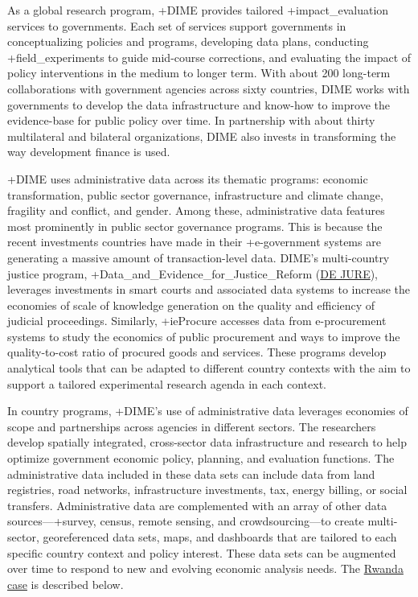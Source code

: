 \documentclass[
]{book}
\begin{document}
As a global research program, +DIME\textbar{} provides tailored +impact\_evaluation\textbar{} services to governments. Each set of services support governments in conceptualizing policies and programs, developing data plans, conducting +field\_experiments\textbar{} to guide mid-course corrections, and evaluating the impact of policy interventions in the medium to longer term. With about 200 long-term collaborations with government agencies across sixty countries, DIME works with governments to develop the data infrastructure and know-how to improve the evidence-base for public policy over time. In partnership with about thirty multilateral and bilateral organizations, DIME also invests in transforming the way development finance is used.

+DIME\textbar{} uses administrative data across its thematic programs: economic transformation, public sector governance, infrastructure and climate change, fragility and conflict, and gender. Among these, administrative data features most prominently in public sector governance programs. This is because the recent investments countries have made in their +e-government\textbar{} systems are generating a massive amount of transaction-level data. DIME's multi-country justice program, +Data\_and\_Evidence\_for\_Justice\_Reform\textbar{} (\href{http://pubdocs.worldbank.org/en/923891592406548876/DE-JURE-Brief.pdf}{DE JURE}), leverages investments in smart courts and associated data systems to increase the economies of scale of knowledge generation on the quality and efficiency of judicial proceedings. Similarly, +ieProcure\textbar{} accesses data from e-procurement systems to study the economics of public procurement and ways to improve the quality-to-cost ratio of procured goods and services. These programs develop analytical tools that can be adapted to different country contexts with the aim to support a tailored experimental research agenda in each context.

In country programs, +DIME\textbar's use of administrative data leverages economies of scope and partnerships across agencies in different sectors. The researchers develop spatially integrated, cross-sector data infrastructure and research to help optimize government economic policy, planning, and evaluation functions. The administrative data included in these data sets can include data from land registries, road networks, infrastructure investments, tax, energy billing, or social transfers. Administrative data are complemented with an array of other data sources---+survey\textbar, census, remote sensing, and crowdsourcing---to create multi-sector, georeferenced data sets, maps, and dashboards that are tailored to each specific country context and policy interest. These data sets can be augmented over time to respond to new and evolving economic analysis needs. The \href{http://pubdocs.worldbank.org/en/703511592406882534/Rwanda-Program-Brief.pdf}{Rwanda case} is described below.
\end{document}
